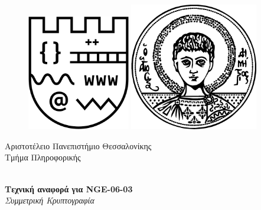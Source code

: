 \begin{titlepage}

    \begin{figure}[!htb]
        \centering
        \begin{minipage}{0.45\textwidth}
            \centering
            \includegraphics[width=0.4\textwidth]{Images/logo_csd.png} %
        \end{minipage}\hfill
        \begin{minipage}{0.45\textwidth}
            \centering
            \includegraphics[width=0.5\textwidth]{Images/logo_auth.png} %
        \end{minipage}
    \end{figure}
     
    \begin{center}
        \LARGE{Αριστοτέλειο Πανεπιστήμιο Θεσσαλονίκης}
        \vspace{5mm}
        \\ \Large{Τμήμα Πληροφορικής}
    \end{center}
    
    \vspace*{\fill}
    
    \begin{center}
        \Rule \\[0.4cm]
        { \LARGE 
            \textbf{Τεχνική αναφορά για NGE-06-03}\\[0.4cm]
            \emph{Συμμετρική Κρυπτογραφία}\\[0.4cm]
        }
        \Rule \\[0.4cm]
    \end{center}
    

\end{titlepage}
